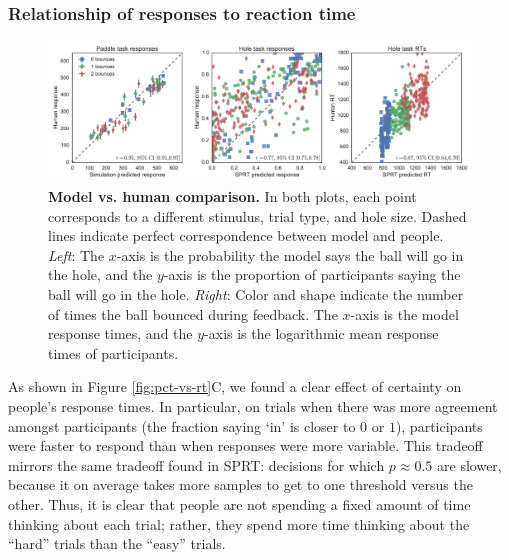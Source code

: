 \documentclass[10pt,letterpaper]{article}
\begin{document}
\subsubsection{Relationship of responses to reaction time}

\begin{figure}[t]
    \begin{center}
        \includegraphics[width=\textwidth]{figures/model_results.pdf}
        \caption{\textbf{Model vs. human comparison.} In both plots, each point corresponds to a different stimulus, trial type, and hole size. Dashed lines indicate perfect correspondence between model and people. \emph{Left}: The $x$-axis is the probability the model says the ball will go in the hole, and the $y$-axis is the proportion of participants saying the ball will go in the hole. \emph{Right}: Color and shape indicate the number of times the ball bounced during feedback. The $x$-axis is the model response times, and the $y$-axis is the logarithmic mean response times of participants.}
        \label{fig:model-results}
    \end{center}
\end{figure}

As shown in Figure \ref{fig:pct-vs-rt}C, we found a clear effect of certainty on people's response times.
In particular, on trials when there was more agreement amongst participants (the fraction saying `in' is closer to $0$ or $1$), participants were faster to respond than when responses were more variable.
This tradeoff mirrors the same tradeoff found in SPRT: decisions for which $p\approx0.5$ are slower, because it on average takes more samples to get to one threshold versus the other.
Thus, it is clear that people are not spending a fixed amount of time thinking about each trial; rather, they spend more time thinking about the ``hard'' trials than the ``easy'' trials.
\end{document}
